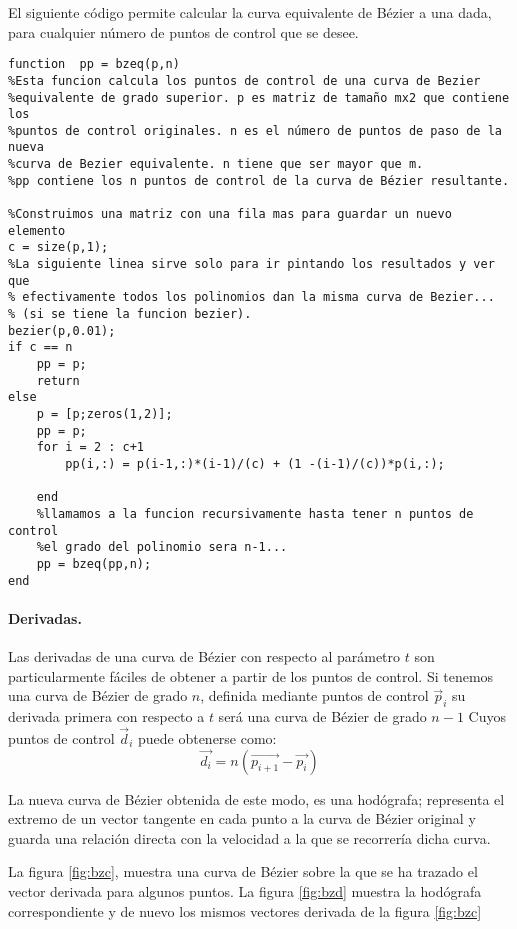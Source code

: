 El siguiente código permite calcular la curva equivalente de Bézier a una dada, para cualquier número de puntos de control que se desee. 

\begin{verbatim}
function  pp = bzeq(p,n)
%Esta funcion calcula los puntos de control de una curva de Bezier
%equivalente de grado superior. p es matriz de tamaño mx2 que contiene los
%puntos de control originales. n es el número de puntos de paso de la nueva
%curva de Bezier equivalente. n tiene que ser mayor que m.
%pp contiene los n puntos de control de la curva de Bézier resultante.

%Construimos una matriz con una fila mas para guardar un nuevo elemento
c = size(p,1);
%La siguiente linea sirve solo para ir pintando los resultados y ver que
% efectivamente todos los polinomios dan la misma curva de Bezier... 
% (si se tiene la funcion bezier).
bezier(p,0.01);
if c == n
    pp = p;
    return
else
    p = [p;zeros(1,2)];
    pp = p;
    for i = 2 : c+1
        pp(i,:) = p(i-1,:)*(i-1)/(c) + (1 -(i-1)/(c))*p(i,:);
        
    end
    %llamamos a la funcion recursivamente hasta tener n puntos de control
    %el grado del polinomio sera n-1...
    pp = bzeq(pp,n);
end
\end{verbatim}

\paragraph{Derivadas.} Las derivadas de una curva de Bézier con respecto al parámetro $t$ son particularmente fáciles de obtener a partir de los puntos de control. Si tenemos una curva de Bézier de grado $n$, definida mediante puntos de control $\vec{p}_i$ su derivada primera con respecto a $t$ será una curva de Bézier de grado $n-1$ Cuyos puntos de control $\vec{d}_i$  puede obtenerse como:
\begin{equation*}
\vec{d_i} = n\left(\vec{p_{i+1}} -\vec{p_i}\right)
\end{equation*}

La nueva curva de Bézier obtenida de este modo, es una hodógrafa; representa el extremo de un vector tangente en cada punto a la curva de Bézier original  y guarda una relación directa con la velocidad a la que se recorrería dicha curva. 

La figura \ref{fig:bzc}, muestra una curva de Bézier sobre la que se ha trazado el vector derivada para algunos puntos. La figura \ref{fig:bzd} muestra la hodógrafa correspondiente y de nuevo los mismos vectores derivada de la figura \ref{fig:bzc}


